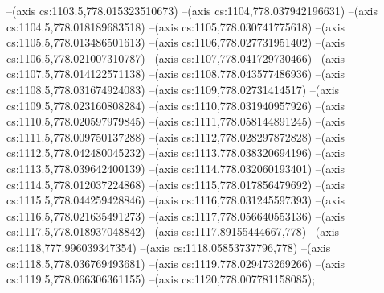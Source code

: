 --(axis cs:1103.5,778.015323510673)
--(axis cs:1104,778.037942196631)
--(axis cs:1104.5,778.018189683518)
--(axis cs:1105,778.030741775618)
--(axis cs:1105.5,778.013486501613)
--(axis cs:1106,778.027731951402)
--(axis cs:1106.5,778.021007310787)
--(axis cs:1107,778.041729730466)
--(axis cs:1107.5,778.014122571138)
--(axis cs:1108,778.043577486936)
--(axis cs:1108.5,778.031674924083)
--(axis cs:1109,778.02731414517)
--(axis cs:1109.5,778.023160808284)
--(axis cs:1110,778.031940957926)
--(axis cs:1110.5,778.020597979845)
--(axis cs:1111,778.058144891245)
--(axis cs:1111.5,778.009750137288)
--(axis cs:1112,778.028297872828)
--(axis cs:1112.5,778.042480045232)
--(axis cs:1113,778.038320694196)
--(axis cs:1113.5,778.039642400139)
--(axis cs:1114,778.032060193401)
--(axis cs:1114.5,778.012037224868)
--(axis cs:1115,778.017856479692)
--(axis cs:1115.5,778.044259428846)
--(axis cs:1116,778.031245597393)
--(axis cs:1116.5,778.021635491273)
--(axis cs:1117,778.056640553136)
--(axis cs:1117.5,778.018937048842)
--(axis cs:1117.89155444667,778)
--(axis cs:1118,777.996039347354)
--(axis cs:1118.05853737796,778)
--(axis cs:1118.5,778.036769493681)
--(axis cs:1119,778.029473269266)
--(axis cs:1119.5,778.066306361155)
--(axis cs:1120,778.007781158085);

